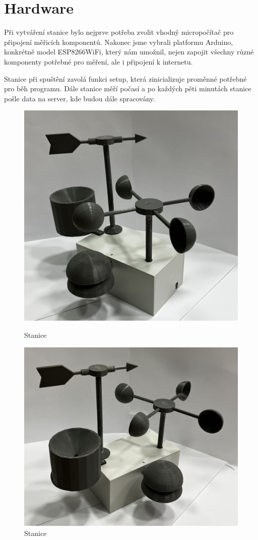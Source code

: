 \section{Hardware}
Při vytváření stanice bylo nejprve potřeba zvolit vhodný micropočítač pro připojení měřicích komponentů. Nakonec jsme vybrali platformu Arduino,
konkrétně model ESP8266WiFi, který nám umožnil, nejen zapojit všechny různé komponenty potřebné pro měření, ale i připojení k internetu.

Stanice při spuštění zavolá funkci setup, která zinicializuje proměnné potřebné pro běh programu. 
Dále stanice měří počasí a po každých pěti minutách stanice pošle data na server, kde budou dále spracovány.

\begin{figure}[!htb]
   \begin{minipage}{0.48\textwidth}
     \centering
     \includegraphics[width=.7\linewidth]{images/stanice0.jpg}
     \caption{Stanice}
   \end{minipage}\hfill
   \begin{minipage}{0.5\textwidth}
     \centering
     \includegraphics[width=.7\linewidth]{images/stanice1.jpg}
     \caption{Stanice}
   \end{minipage}
\end{figure}
